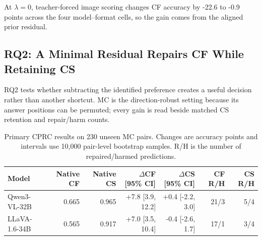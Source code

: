 \documentclass[letterpaper]{article}
\begin{document}
At $\lambda=0$, teacher-forced image scoring changes CF accuracy
by -22.6 to -0.9 points across the four model--format cells, so the gain comes
from the aligned prior residual.

\subsection{RQ2: A Minimal Residual Repairs CF While Retaining CS}

RQ2 tests whether subtracting the identified preference creates a useful
decision rather than another shortcut. MC is the direction-robust setting
because its answer positions can be permuted; every gain
is read beside matched CS retention and repair/harm counts.

\begin{table}[t]
\centering
\small
\begin{tabular*}{\textwidth}{@{\extracolsep{\fill}}lrrrrrr@{}}
\toprule
Model & Native CF & Native CS & $\Delta$CF [95\% CI] & $\Delta$CS [95\% CI]
& CF R/H & CS R/H \\
\midrule
Qwen3-VL-32B
& 0.665 & 0.965 & +7.8 [3.9, 12.2] & +0.4 [-2.2, 3.0] & 21/3 & 5/4 \\
LLaVA-1.6-34B
& 0.565 & 0.917 & +7.0 [3.5, 10.4] & -0.4 [-2.6, 1.7] & 17/1 & 3/4 \\
\bottomrule
\end{tabular*}
\caption{Primary CPRC results on 230 unseen MC pairs. Changes are accuracy
points and intervals use 10,000 pair-level bootstrap samples. R/H is the
number of repaired/harmed predictions.}
\label{tab:main}
\end{table}
\end{document}
